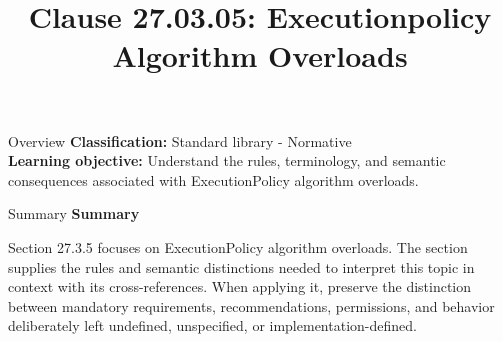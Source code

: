 \documentclass[10pt,letterpaper]{article}
\title{Clause 27.03.05: Executionpolicy Algorithm Overloads}
\author{}
\date{}
\begin{document}
\maketitle
\begin{CornellOverviewBox}{Overview}
\textbf{Classification:} Standard library - Normative\\[2pt]
\textbf{Learning objective:} Understand the rules, terminology, and semantic consequences associated with ExecutionPolicy algorithm overloads.
\end{CornellOverviewBox}\begin{CornellSummaryBox}{Summary}
{\sffamily\bfseries\color{Accent} Summary}\par\vspace{3pt}Section 27.3.5 focuses on ExecutionPolicy algorithm overloads. The section supplies the rules and semantic distinctions needed to interpret this topic in context with its cross-references. When applying it, preserve the distinction between mandatory requirements, recommendations, permissions, and behavior deliberately left undefined, unspecified, or implementation-defined.
\end{CornellSummaryBox}
\end{document}
